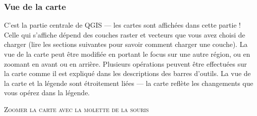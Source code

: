 \subsubsection{Vue de la carte}\label{label_mapview}


C'est la partie centrale de QGIS — les cartes sont affichées dans cette partie ! Celle qui s'affiche dépend des couches raster et vecteurs que vous avez choisi de charger (lire les sections suivantes pour savoir comment charger une couche). La vue de la carte peut être modifiée en portant le focus sur une autre région, ou en zoomant en avant ou en arrière. Plusieurs opérations peuvent être effectuées sur la carte comme il est expliqué dans les descriptions des barres d'outils. La vue de la carte et la légende sont étroitement liées — la carte reflète les changements que vous opérez dans la légende.


\begin{Astuce}\caption{\textsc{Zoomer la carte avec la molette de la souris}}
\end{Astuce}


